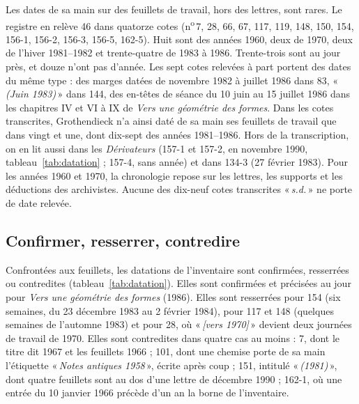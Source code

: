 \documentclass[11pt]{amsart}
\newcommand{\q}[1]{«\,\textit{#1}\,»}
\newcommand{\cote}[1]{\mbox{n\textsuperscript{o}\,#1}}
\begin{document}
Les dates de sa main sur des feuillets de travail, hors des lettres, sont rares. Le registre en relève 46 dans quatorze cotes (\cote{7}, 28, 66, 67, 117, 119, 148, 150, 154, 156-1, 156-2, 156-3, 156-5, 162-5). Huit sont des années 1960, deux de 1970, deux de l'hiver 1981--1982 et trente-quatre de 1983 à 1986. Trente-trois sont au jour près, et douze n'ont pas d'année. Les sept cotes relevées à part portent des dates du même type : des marges datées de novembre 1982 à juillet 1986 dans 83, \q{(Juin 1983)} dans 144, des en-têtes de séance du 10 juin au 15 juillet 1986 dans les chapitres IV et VI à IX de \emph{Vers une géométrie des formes}. Dans les cotes transcrites, Grothendieck n'a ainsi daté de sa main ses feuillets de travail que dans vingt et une, dont dix-sept des années 1981--1986. Hors de la transcription, on en lit aussi dans les \emph{Dérivateurs} (157-1 et 157-2, en novembre 1990, tableau~\ref{tab:datation} ; 157-4, sans année) et dans 134-3 (27 février 1983). Pour les années 1960 et 1970, la chronologie repose sur les lettres, les supports et les déductions des archivistes. Aucune des dix-neuf cotes transcrites \q{s.d.} ne porte de date relevée.

\subsection{Confirmer, resserrer, contredire}

Confrontées aux feuillets, les datations de l'inventaire sont confirmées, resserrées ou contredites (tableau~\ref{tab:datation}). Elles sont confirmées et précisées au jour pour \emph{Vers une géométrie des formes} (1986). Elles sont resserrées pour 154 (six semaines, du 23 décembre 1983 au 2 février 1984), pour 117 et 148 (quelques semaines de l'automne 1983) et pour 28, où \q{[vers 1970]} devient deux journées de travail de 1970. Elles sont contredites dans quatre cas au moins : 7, dont le titre dit 1967 et les feuillets 1966 ; 101, dont une chemise porte de sa main l'étiquette \q{Notes antiques 1958}, écrite après coup ; 151, intitulé \q{(1981)}, dont quatre feuillets sont au dos d'une lettre de décembre 1990 ; 162-1, où une entrée du 10 janvier 1966 précède d'un an la borne de l'inventaire.
\end{document}
